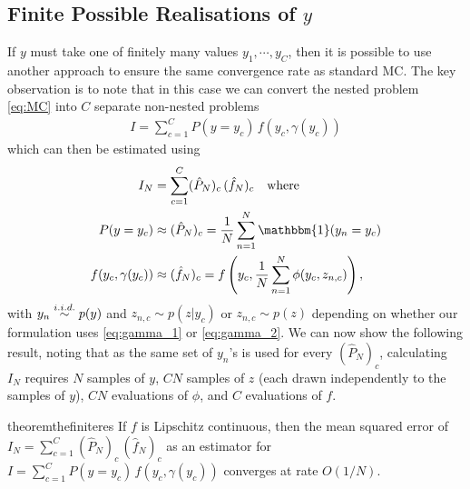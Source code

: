
\subsection{Finite Possible Realisations of $y$}
\label{sec:discrete}

If $y$ must take one of finitely many values $y_1, \cdots, y_C$, then it is possible to
use another approach to ensure the same convergence rate as standard MC.
The key observation is to note that in this case we can convert the nested problem
\eqref{eq:MC} into $C$ separate non-nested problems
\begin{align}
         I = \sum_{c=1}^C P(y = y_c) \, f(y_c, \gamma(y_c))
\end{align}
which can then be estimated using
\begin{align}
        I_N  &= \sum_{c=1}^C (\hat{P}_N)_c \, (\hat{f}_N)_c \quad \text{where}
        \label{eq:IN} \\
        \label{eq:PN}
        P(y = y_c) &\approx (\hat{P}_N)_c = \frac{1}{N} \sum_{n=1}^N \mathbbm{1}(y_n = y_c)  \\
        \label{eq:fn}
        f(y_c, \gamma(y_c)) &\approx (\hat{f}_N)_c = f\left(y_c, \frac{1}{N} \sum_{n=1}^N \phi(y_c, z_{n,c})\right),
\end{align}
with $y_n \overset{i.i.d.}{\sim} p(y)$ and $z_{n,c} \sim p(z|y_c)$ or $z_{n,c} \sim p(z)$  
depending on whether our formulation uses
\eqref{eq:gamma_1} or \eqref{eq:gamma_2}.  
We can now show the following result, noting that as the same set of $y_n$'s is used for every
$(\hat{P}_N)_c$, calculating $I_N$ requires $N$ samples of $y$, 
$CN$ samples of $z$ (each
drawn independently to the samples of $y$), $CN$ evaluations of $\phi$, and $C$ evaluations of $f$.
\begin{restatable}{theorem}{thefiniteres}
	\label{the:finite-res}
  If $f$ is Lipschitz continuous, then the mean squared error of $I_N  = \sum_{c=1}^C (\hat{P}_N)_c \, (\hat{f}_N)_c$ 
  as an estimator for $I= \sum_{c=1}^C P(y = y_c) \, f(y_c, \gamma(y_c))$ converges at rate $O(1/N)$.
\end{restatable}
%
%
